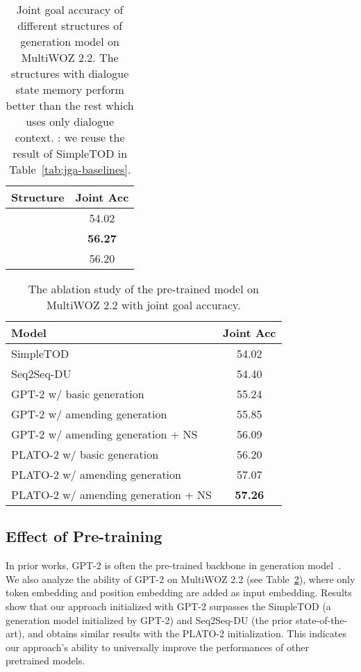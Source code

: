 \documentclass[11pt]{article}
\begin{document}
\begin{table}
\centering
\begin{tabular}{lc}
\hline
\textbf{Structure} & \textbf{Joint Acc} \\
\hline
\hline
  & 54.02 \\
 & \textbf{56.27} \\
 & 56.20 \\
\hline
\end{tabular}
\caption{Joint goal accuracy of different structures of generation model on MultiWOZ 2.2. The structures with dialogue state memory perform better than the rest which uses only dialogue context. : we reuse the result of SimpleTOD in Table~\ref{tab:jga-baselines}.}\label{tab:structures}
\end{table}

\begin{table}
\centering
\small
\begin{tabular}{lc}
\hline
\textbf{Model} & \textbf{Joint Acc} \\
\hline
\hline
SimpleTOD & 54.02 \\
Seq2Seq-DU & 54.40 \\
\hline
GPT-2 w/ basic generation & 55.24 \\
GPT-2 w/ amending generation & 55.85 \\
GPT-2 w/ amending generation + NS & 56.09 \\
\hline
PLATO-2 w/ basic generation & 56.20 \\
PLATO-2 w/ amending generation & 57.07 \\
PLATO-2 w/ amending generation + NS & \textbf{57.26} \\
\hline
\end{tabular}
\caption{The ablation study of the pre-trained model on MultiWOZ 2.2 with joint goal accuracy.}\label{tab:ablation-pretrain}
\end{table}

\subsection{Effect of Pre-training}
In prior works, GPT-2 is often the pre-trained backbone in generation model~\citep{NEURIPS2020_e9462095,ham-etal-2020-end,yang2021ubar}. We also analyze the ability of GPT-2 on MultiWOZ 2.2 (see Table~\ref{tab:ablation-pretrain}), where only token embedding and position embedding are added as input embedding. Results show that our approach initialized with GPT-2 surpasses the SimpleTOD (a generation model initialized by GPT-2) and Seq2Seq-DU (the prior state-of-the-art), and obtains similar results with the PLATO-2 initialization. This indicates our approach's ability to universally improve the performances of other pretrained models.
\end{document}
